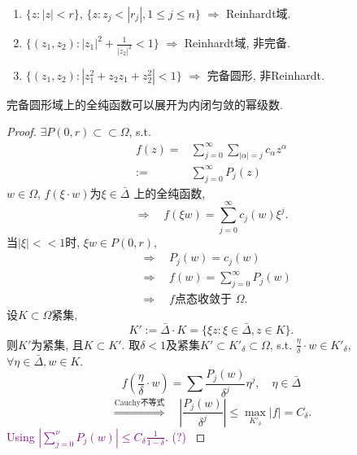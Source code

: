 \begin{example}
  \begin{enumerate}[1).]
    \item $\{z : |z|<r\}$, $\{z: z_j <|r_j|,1 \leq j \leq n\}$  $\Rightarrow $ Reinhardt域.
    \item  $\{(z_1,z_2):|z_1|^2+\frac{1}{|z_2|^2}<1\}$ $\Rightarrow $ Reinhardt域, 非完备.
    \item $\{(z_1,z_2):|z_1^2+z_2z_1+z_2^2|< 1\}$   $\Rightarrow $ 完备圆形, 非Reinhardt. 
  \end{enumerate}
\end{example}

\begin{theorem}[H.Cartan]
  完备圆形域上的全纯函数可以展开为内闭匀敛的幂级数. 
\end{theorem}
\begin{proof}
  $\exists P(0,r) \subset \subset \Omega $, s.t. 
  $$ \begin{aligned}
    f(z)=& \sum_{j=0}^{ \infty }\sum_{|\alpha |=j}^{} c_\alpha z^\alpha \\
    := & \sum_{j=0}^{\infty } P_j(z)
  \end{aligned}  $$ 
  $w \in \Omega $, $f(\xi \cdot w)$为$\xi \in \bar \Delta $  上的全纯函数,
  $$ \Rightarrow \quad f(\xi w)=\sum_{j=0}^{ \infty }c_j(w)\xi ^j. $$
  当$|\xi| <<1 $时, $\xi w \in P(0,r)$,
  $$ \begin{aligned}
    &\Rightarrow  \quad P_j(w)=c_j(w)\\
    &\Rightarrow  \quad f(w)=\sum_{j=0}^{\infty }P_j(w) \\
    & \Rightarrow \quad f  \text{点态收敛于 } \Omega .
  \end{aligned}  $$ 
  设$K \subset \Omega $紧集,
  $$ K':= \bar{\Delta } \cdot K=\{\xi z: \xi \in \bar{\Delta }, z\in K\}. $$
  则$K'$为紧集, 且$K \subset K'$. 取$\delta <1$及紧集$K' \subset K'_{\delta } \subset \Omega $, s.t. $\frac{\eta }{\delta } \cdot w \in K'_{\delta }$, $\forall \eta \in \bar{\Delta },w \in K$.
  $$ f(\frac{\eta }{\delta } \cdot w) =\sum \frac{P_j(w)}{\delta ^j}\eta ^j, \quad \eta \in \bar{\Delta }$$  
  $$ \overset{\text{Cauchy不等式}}{\Rightarrow} \quad \left| \frac{P_j(w)}{\delta ^j} \right| \leq \max_{K'_{\delta }}|f|=C_\delta .$$
  \textcolor{purple}{Using $\left| \sum_{j=0}^{\nu }P_j(w) \right| \leq C_\delta \frac{1}{1-\delta } $. (?) }
\end{proof}

